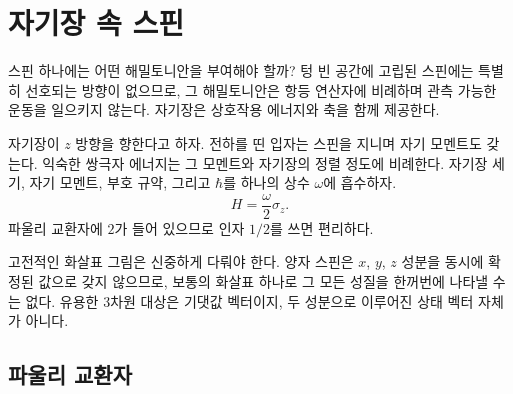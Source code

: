 \begin{classroomqa}\end{classroomqa}

\begin{classroomqa}\end{classroomqa}

\section{자기장 속 스핀}

스핀 하나에는 어떤 해밀토니안을 부여해야 할까? 텅 빈 공간에 고립된 스핀에는 특별히 선호되는 방향이 없으므로, 그 해밀토니안은 항등 연산자에 비례하며 관측 가능한 운동을 일으키지 않는다. 자기장은 상호작용 에너지와 축을 함께 제공한다.

자기장이 \(z\) 방향을 향한다고 하자. 전하를 띤 입자는 스핀을 지니며 자기 모멘트도 갖는다. 익숙한 쌍극자 에너지는 그 모멘트와 자기장의 정렬 정도에 비례한다. 자기장 세기, 자기 모멘트, 부호 규약, 그리고 \(\hbar\)를 하나의 상수 \(\omega\)에 흡수하자.
\begin{equation}
H=\frac{\omega}{2}\sigma_z.
\label{eq:l5-z-hamiltonian}
\end{equation}
파울리 교환자에 \(2\)가 들어 있으므로 인자 \(1/2\)를 쓰면 편리하다.

고전적인 화살표 그림은 신중하게 다뤄야 한다. 양자 스핀은 \(x\), \(y\), \(z\) 성분을 동시에 확정된 값으로 갖지 않으므로, 보통의 화살표 하나로 그 모든 성질을 한꺼번에 나타낼 수는 없다. 유용한 3차원 대상은 기댓값 벡터이지, 두 성분으로 이루어진 상태 벡터 자체가 아니다.

\subsection{파울리 교환자}

